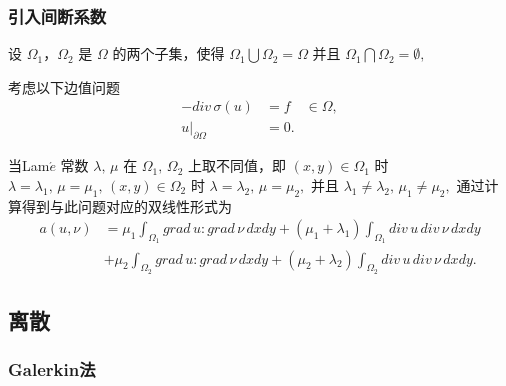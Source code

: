 \documentclass[a4paper,UTF8,titlepage,10pt]{ctexart}
\numberwithin{equation}{subsection}
\begin{document}
\subsubsection{引入间断系数}

设 $\Omega_1$，$\Omega_2$ 是 $\Omega$ 的两个子集，使得 $\Omega_1 \bigcup \Omega_2 = \Omega$ 并且 $\Omega_1 \bigcap \Omega_2 = \emptyset,$

考虑以下边值问题
\begin{equation}
\begin{aligned}
	-div \, \sigma(u) &= f \quad \in \Omega, \\
	u |_{\partial \Omega} &= 0 .
\end{aligned}
\end{equation}

当Lam$\acute{e}$ 常数 $\lambda, \, \mu$ 在 $\Omega_1, \, \Omega_2$ 上取不同值，即 $(x,y) \in \Omega_1$ 时 $\lambda = \lambda_1, \, \mu = \mu_1 , \,(x,y) \in \Omega_2$ 时 $\lambda = \lambda_2, \, \mu = \mu_2,$ 并且 $\lambda_1 \ne \lambda_2, \, \mu_1 \ne \mu_2,$ 通过计算得到与此问题对应的双线性形式为
\begin{equation}
\begin{aligned}
	a(u,\nu) &= \mu_1 \int_{\Omega_1} grad \, u : grad \, \nu \, dxdy + (\mu_1 +\lambda_1) \int_{\Omega_1} div \, u \, div \, \nu \,  dxdy \\
	&+ \mu_2 \int_{\Omega_2} grad \, u : grad \, \nu \, dxdy + (\mu_2 +\lambda_2) \int_{\Omega_2} div \, u \, div \, \nu \, dxdy .
\end{aligned}
\end{equation}

\subsection{离散}

\subsubsection{Galerkin法}

\begin{figure}[h]
	\centering
	\caption{}
	\label{hf}
\end{figure}
\end{document}

